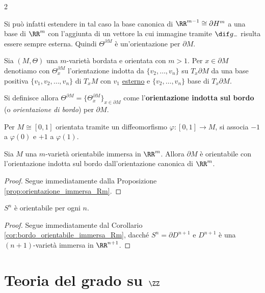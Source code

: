 \begin{multicols*}{2}
\begin{remark}
        Si può infatti estendere in tal caso la base canonica di $\RR^{m-1} \cong \partial H^m$ a una base di $\RR^m$ con l'aggiunta di
        un vettore la cui immagine tramite $\dif g_{-}$ risulta essere sempre esterna. Quindi
        $\Theta^{\partial M}$ è un'orientazione per $\partial M$.
    \end{remark}

    \begin{definition}
        Sia $(M, \Theta)$ una $m$-varietà bordata e orientata con $m > 1$. Per $x \in \partial M$ denotiamo con
        $\Theta_x^{\partial M}$ l'orientazione indotta da $\{v_2, \ldots, v_n\}$ su $T_x \partial M$ da una base positiva $\{v_1, v_2, \ldots, v_n\}$ di $T_x M$
        con $v_1$ \underline{esterno} e $\{v_2, \ldots, v_n\}$ base di $T_x \partial M$. \smallskip

        Si definisce allora $\Theta^{\partial M} = \{ \Theta_x^{\partial M} \}_{x \in \partial M}$ come
        l'\textbf{orientazione indotta sul bordo} (o \textit{orientazione di bordo}) per $\partial M$.

        Per $M \cong [0, 1]$ orientata tramite un diffeomorfismo $\varphi : [0, 1] \to M$, si associa
        $-1$ a $\varphi(0)$ e $+1$ a $\varphi(1)$.
    \end{definition}

    \begin{corollary} \label{cor:bordo_orientabile_immersa_Rm}
        Sia $M$ una $m$-varietà orientabile immersa in $\RR^m$. Allora
        $\partial M$ è orientabile con l'orientazione indotta sul bordo dall'orientazione
        canonica di $\RR^m$.
    \end{corollary}

    \begin{proof}
        Segue immediatamente dalla Proposizione \ref{prop:orientazione_immersa_Rm}.
    \end{proof}

    \begin{corollary}
        $S^n$ è orientabile per ogni $n$.
    \end{corollary}

    \begin{proof}
        Segue immediatamente dal Corollario \ref{cor:bordo_orientabile_immersa_Rm},
        dacché $S^n = \partial D^{n+1}$ e $D^{n+1}$ è una $(n+1)$-varietà immersa
        in $\RR^{n+1}$.
    \end{proof}

    \section{Teoria del grado su \texorpdfstring{$\ZZ$}{ℤ}}


\end{multicols*}
